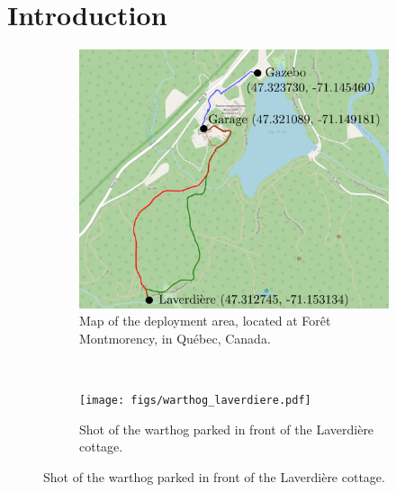 \section{Introduction}
\label{sec:intro}

\lightlipsum[1]

\begin{figure} [h]
	\begin{center}
	\begin{subfigure} [b] {0.4\textwidth}
		\includegraphics[width=\linewidth]{figs/fm_paths.pdf}
		\caption{Map of the deployment area, located at For\^{e}t Montmorency, in Québec, Canada.}
		\label{fig:front_fig}
	\end{subfigure}
	~~
	\begin{subfigure} [b] {0.45\textwidth}
		\texttt{[image: figs/warthog\_laverdiere.pdf]}
		\caption{Shot of the warthog parked in front of the Laverdière cottage.}
		\label{fig:front_fig}
	\end{subfigure}
	\end{center}
\end{figure}

\lightlipsum[1]
\lightlipsum[1]
\lightlipsum[1]